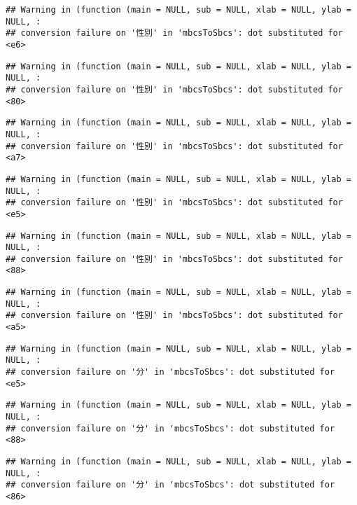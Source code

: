 \documentclass[
]{book}
\begin{document}
\begin{verbatim}
## Warning in (function (main = NULL, sub = NULL, xlab = NULL, ylab = NULL, :
## conversion failure on '性別' in 'mbcsToSbcs': dot substituted for <e6>
\end{verbatim}

\begin{verbatim}
## Warning in (function (main = NULL, sub = NULL, xlab = NULL, ylab = NULL, :
## conversion failure on '性別' in 'mbcsToSbcs': dot substituted for <80>
\end{verbatim}

\begin{verbatim}
## Warning in (function (main = NULL, sub = NULL, xlab = NULL, ylab = NULL, :
## conversion failure on '性別' in 'mbcsToSbcs': dot substituted for <a7>
\end{verbatim}

\begin{verbatim}
## Warning in (function (main = NULL, sub = NULL, xlab = NULL, ylab = NULL, :
## conversion failure on '性別' in 'mbcsToSbcs': dot substituted for <e5>
\end{verbatim}

\begin{verbatim}
## Warning in (function (main = NULL, sub = NULL, xlab = NULL, ylab = NULL, :
## conversion failure on '性別' in 'mbcsToSbcs': dot substituted for <88>
\end{verbatim}

\begin{verbatim}
## Warning in (function (main = NULL, sub = NULL, xlab = NULL, ylab = NULL, :
## conversion failure on '性別' in 'mbcsToSbcs': dot substituted for <a5>
\end{verbatim}

\begin{verbatim}
## Warning in (function (main = NULL, sub = NULL, xlab = NULL, ylab = NULL, :
## conversion failure on '分' in 'mbcsToSbcs': dot substituted for <e5>
\end{verbatim}

\begin{verbatim}
## Warning in (function (main = NULL, sub = NULL, xlab = NULL, ylab = NULL, :
## conversion failure on '分' in 'mbcsToSbcs': dot substituted for <88>
\end{verbatim}

\begin{verbatim}
## Warning in (function (main = NULL, sub = NULL, xlab = NULL, ylab = NULL, :
## conversion failure on '分' in 'mbcsToSbcs': dot substituted for <86>
\end{verbatim}
\end{document}
